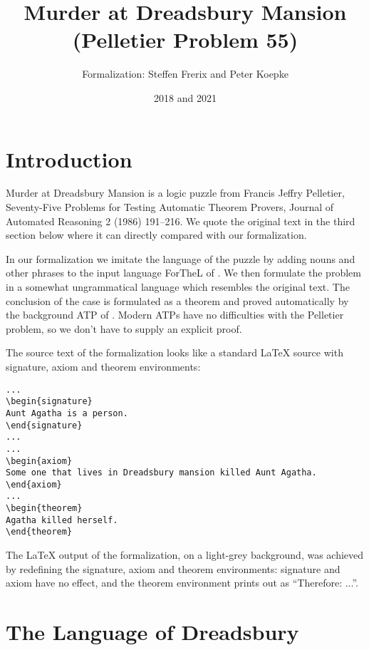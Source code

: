 \documentclass{article}
\title{Murder at Dreadsbury Mansion (Pelletier Problem 55)}
\author{\Naproche{} Formalization: Steffen Frerix and Peter Koepke}
\date{2018 and 2021}
\begin{document}

  \maketitle
\section{Introduction}

Murder at Dreadsbury Mansion is a logic puzzle from 
Francis Jeffry Pelletier, Seventy-Five Problems for Testing
Automatic Theorem Provers, Journal of Automated Reasoning 2 (1986) 191--216.
We quote the original text in the third section below where it can
directly compared with our formalization.

In our formalization we imitate the language of the puzzle by 
adding nouns and other phrases to the input language ForTheL of \Naproche{}.
We then formulate the problem in a somewhat ungrammatical language
which resembles the original text.
The conclusion of the case is formulated as a theorem and
proved automatically by the background ATP of \Naproche. Modern
ATPs have no difficulties with the Pelletier problem, so we don't
have to supply an explicit proof.


The source text of the formalization looks like a standard \LaTeX{} source
with signature, axiom and theorem environments:

\begin{verbatim}
...
\begin{signature}
Aunt Agatha is a person.
\end{signature}
...
...
\begin{axiom}
Some one that lives in Dreadsbury mansion killed Aunt Agatha.
\end{axiom}
...
\begin{theorem}
Agatha killed herself.
\end{theorem}
\end{verbatim}

The \LaTeX{} output of the formalization, on a light-grey background,  was 
achieved by redefining the signature,
axiom and theorem environments: signature and axiom have no effect, and
the theorem environment prints out as ``Therefore: ...''.

\section{The Language of Dreadsbury}
\end{document}
